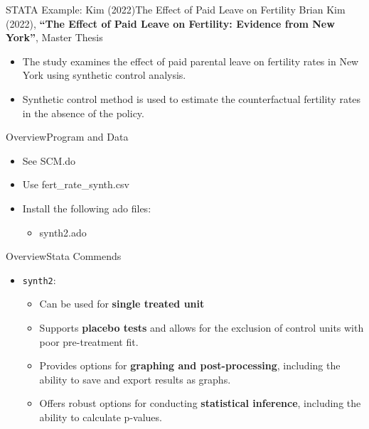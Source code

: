 \documentclass[hyperref={pdfpagelabels=false}]{beamer}
\begin{document}
\begin{frame}{STATA Example: Kim (2022)}{The Effect of Paid Leave on Fertility}
Brian Kim (2022), \textbf{``The Effect of Paid Leave on Fertility: Evidence from New York''}, Master Thesis
\begin{itemize}
	\vspace{0.2cm}
	\item The study examines the effect of paid parental leave on fertility rates in New York using synthetic control analysis.
	\vspace{0.2cm}
	\item Synthetic control method is used to estimate the counterfactual fertility rates in the absence of the policy.
\end{itemize}
\end{frame}




\begin{frame}{Overview}{Program and Data}
	\begin{itemize}
		\item See SCM.do
		\vspace{0.2cm}
		\item Use fert\_rate\_synth.csv
		\vspace{0.2cm}
		\item Install the following ado files:
		\begin{itemize}
			\vspace{0.2cm}
			\item synth2.ado 
		
			
		\end{itemize}
		
	\end{itemize}
\end{frame}





\begin{frame}[fragile]{Overview}{Stata Commends}
\begin{itemize}

	\item \texttt{synth2}:
	\vspace{0.2cm}
	\begin{itemize}
		\item Can be used for \textbf{single treated unit}
		\vspace{0.2cm}
		\item Supports \textbf{placebo tests} and allows for the exclusion of control units with poor pre-treatment fit.
		\vspace{0.2cm}
		\item Provides options for \textbf{graphing and post-processing}, including the ability to save and export results as graphs.
		\vspace{0.2cm}
		\item Offers robust options for conducting \textbf{statistical inference}, including the ability to calculate p-values.
	\end{itemize}
\end{itemize}
\end{frame}
\end{document}

